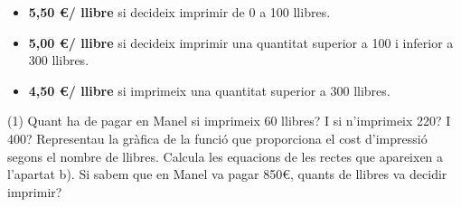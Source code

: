 \begin{extrapage}
	\begin{itemize}
		\item \textbf{5,50 \euro / llibre} si decideix imprimir de 0 a 100 llibres.
		\item \textbf{5,00 \euro / llibre} si decideix imprimir una quantitat superior a 100 i inferior a 300 llibres.
		\item \textbf{4,50 \euro / llibre} si imprimeix una quantitat superior a 300 llibres.
	\end{itemize}
	
	\begin{tasks}(1)
		\task Quant ha de pagar en Manel si imprimeix 60 llibres? I si n'imprimeix 220? I 400?
		\task Representau la gràfica de la funció que proporciona el cost d'impressió segons el nombre de llibres.
		\task Calcula les equacions de les rectes que apareixen a l'apartat b).
		\task Si sabem que en Manel va pagar 850\euro, quants de llibres va decidir imprimir?
	\end{tasks}


\end{extrapage}
 
